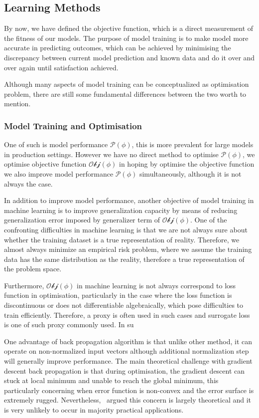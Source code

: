 \subsection {Learning Methods}
By now, we have defined the objective function, which is a direct measurement of the fitness of our models. The purpose of model training is to make model more accurate in predicting outcomes, which can be achieved by minimising the discrepancy between current model prediction and known data and do it over and over again until satisfaction achieved. 
\par 
Although many aspects of model training can be conceptualized as optimisation problem, there are still some fundamental differences between the two worth to mention. 
\par 
\subsubsection{Model Training and Optimisation}
One of such is model performance $\mathcal{P}(\phi)$, this is more prevalent for large models in production settings. However we have no direct method to optimise $\mathcal{P}(\phi)$, we optimise objective function $\mathcal{Obj}(\phi)$ in hoping by optimise the objective function we also improve model performance $\mathcal{P}(\phi)$ simultaneously, although it is not always the case.
\par 
In addition to improve model performance, another objective of model training in machine learning is to improve generalization capacity by means of reducing generalization error imposed by generalizer term of $\mathcal{Obj}(\phi)$. One of the confronting difficulties in machine learning is that we are not always sure about whether the training dataset is a true representation of reality. Therefore, we almost always minimize an empirical risk problem, where we assume the training data has the same distribution as the reality, therefore a true representation of the problem space.
\par
Furthermore, $\mathcal{Obj}(\phi)$ in machine learning is not always correspond to loss function in optimisation, particularly in the case where the loss function is discontinuous or does not differentiable algebraically, which pose difficulties to train efficiently. Therefore, a proxy is often used in such cases and surrogate loss is one of such proxy commonly used. In su

One advantage of back propagation algorithm is that unlike other method, it can operate on non-normalized input vectors although additional normalization step will generally improve performance. \cite{Buckland:2002} The main theoretical challenge with gradient descent back propagation is that during optimisation, the gradient descent can stuck at local minimum and unable to reach the global minimum, this particularly concerning when error function is non-convex and the error surface is extremely rugged. Nevertheless,~\citet{LeCun_2015} argued this concern is largely theoretical and it is very unlikely to occur in majority practical applications. 